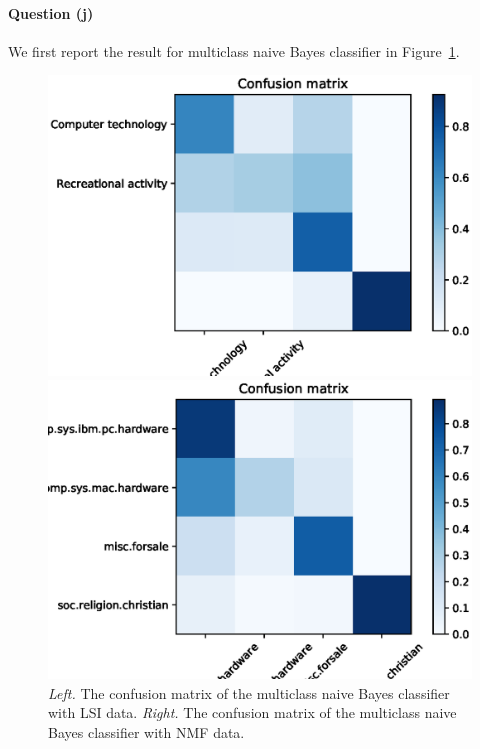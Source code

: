 \documentclass[letterpaper]{article}
\begin{document}
\paragraph{Question (j)}
We first report the result for multiclass naive Bayes classifier
in Figure~\ref{fig:multi-bayes-2}.
\begin{figure}[!htb]
\centering
\begin{minipage}{0.5\textwidth}
\includegraphics[width=1.0\textwidth]{conf-mat-lsi-multi-bayes}
\end{minipage}%
\begin{minipage}{0.5\textwidth}
\includegraphics[width=1.0\textwidth]{conf-mat-nmf-multi-bayes}
\end{minipage}
\caption{\emph{Left.} The confusion matrix of the multiclass naive
Bayes classifier with LSI data.
\emph{Right.} The confusion matrix of the multiclass naive
Bayes classifier with NMF data.}
\label{fig:multi-bayes-2}
\end{figure}
\end{document}
